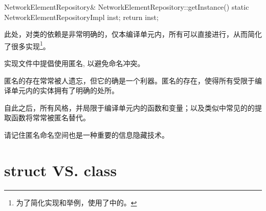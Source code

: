 \begin{content}
\begin{leftbar}
\begin{c++}
NetworkElementRepository& NetworkElementRepository::getInstance()
{
    static NetworkElementRepositoryImpl inst;
    return inst;
}
\end{c++}
\end{leftbar}

此处，对类的依赖是非常明确的，仅本编译单元内，所有可以直接进行，从而简化了很多实现\footnote{为了简化实现和举例，使用了中的。}。

\begin{regulation}
实现文件中提倡使用匿名, 以避免命名冲突。
\end{regulation}

匿名的存在常常被人遗忘，但它的确是一个利器。匿名的存在，使得所有受限于编译单元内的实体拥有了明确的处所。

自此之后，所有\clang{}风格，并局限于编译单元内的函数和变量；以及类似中常见的的提取函数将常常被匿名替代。

请记住匿名命名空间也是一种重要的信息隐藏技术。

\end{content}

\section{struct VS. class}

